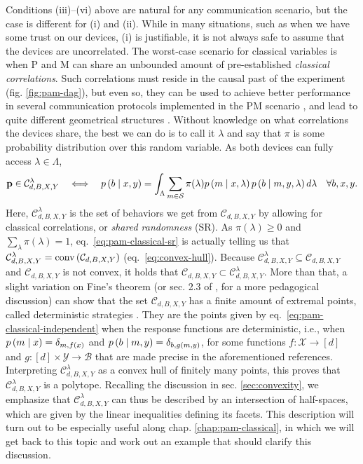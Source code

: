             Conditions (iii)--(vi) above are natural for any communication scenario, but the case is different for (i) and (ii). While in many situations, such as when we have some trust on our devices, (i) is justifiable, it is not always safe to assume that the devices are uncorrelated. The worst-case scenario for classical variables is when P and M can share an unbounded amount of pre-established \emph{classical correlations}. Such correlations must reside in the causal past of the experiment (fig. \ref{fig:pam-dag}), but even so, they can be used to achieve better performance in several communication protocols implemented in the PM scenario \cite{de_vicente_bound_2019}, and lead to quite different geometrical structures \cite{de_vicente_shared_2017,dallarno_robustness_2012}. Without knowledge on what correlations the devices share, the best we can do is to call it $\lambda$ and say that $\pi$ is some probability distribution over this random variable. As both devices can fully access $\lambda \in \Lambda$,
            \begin{equation}
                \mathbf{p} \in \mathcal{C}_{d,B,X,Y}^\lambda \quad\Longleftrightarrow \quad p \left( b \mid x,y \right) = \int_{\Lambda} \sum_{m \in \mathcal{S}} \pi(\lambda) p \left( m \mid x,\lambda \right) p \left( b \mid m,y,\lambda \right) d\lambda \quad\forall b,x,y .
                \label{eq:pam-classical-sr}
            \end{equation}
            Here, $\mathcal{C}_{d,B,X,Y}^\lambda$ is the set of behaviors we get from $\mathcal{C}_{d,B,X,Y}$ by allowing for classical correlations, or \emph{shared randomness} (SR). As $\pi(\lambda) \geq 0$ and $\sum_\lambda \pi(\lambda) = 1$, eq.~\eqref{eq:pam-classical-sr} is actually telling us that $\mathcal{C}_{d,B,X,Y}^\lambda = \text{conv} \left( \mathcal{C}_{d,B,X,Y} \right)$ (eq.~\eqref{eq:convex-hull}). Because $\mathcal{C}_{d,B,X,Y}^\lambda \subseteq \mathcal{C}_{d,B,X,Y}$ and $\mathcal{C}_{d,B,X,Y}$ is not convex, it holds that $\mathcal{C}_{d,B,X,Y} \subset \mathcal{C}^\lambda_{d,B,X,Y}$. More than that, a slight variation on Fine's theorem \cite{fine_hidden_1982} (or sec. 2.3 of \cite{scarani_bell_2019}, for a more pedagogical discussion) can show that the set $\mathcal{C}_{d,B,X,Y}$ has a finite amount of extremal points, called deterministic strategies \cite{gallego_pam_2010,de_vicente_bound_2019}. They are the points given by eq.~\eqref{eq:pam-classical-independent} when the response functions are deterministic, i.e., when $p \left( m \mid x \right) = \delta_{m,f(x)}$ and $ p \left( b \mid m,y \right) = \delta_{b,g(m,y)}$, for some functions $f : \mathcal{X} \rightarrow [d]$ and $g : [d] \times \mathcal{Y} \rightarrow \mathcal{B}$ that are made precise in the aforementioned references. Interpreting $\mathcal{C}_{d,B,X,Y}^\lambda$ as a convex hull of finitely many points, this proves that $\mathcal{C}_{d,B,X,Y}^\lambda$ is a polytope. Recalling the discussion in sec. \ref{sec:convexity}, we emphasize that $\mathcal{C}_{d,B,X,Y}^\lambda$ can thus be described by an intersection of half-spaces, which are given by the linear inequalities defining its facets. This description will turn out to be especially useful along chap. \ref{chap:pam-classical}, in which we will get back to this topic and work out an example that should clarify this discussion.


